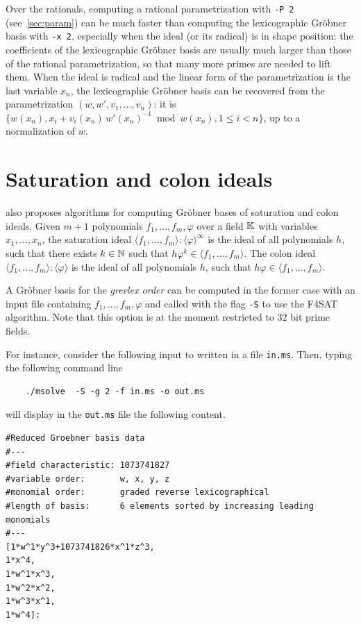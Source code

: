 \documentclass[a4paper,english,11pt]{scrartcl}
\theoremstyle{definition}
\theoremstyle{remark}
\def\leq{\leqslant}
\begin{document}
Over the rationals, computing a rational parametrization with \verb+-P 2+
(see~\cref{sec:param}) can be much faster than computing the lexicographic
Gr\"obner basis with \verb+-x 2+, especially when the ideal (or its radical)
is in shape position: the coefficients of the lexicographic Gr\"obner basis
are usually much larger than those of the rational parametrization, so that
many more primes are needed to lift them. When the
ideal is radical and the linear form of the parametrization is the last
variable $x_n$, the lexicographic Gr\"obner basis can be recovered from the
parametrization $(w, w', v_1, \ldots, v_n)$: it is
$\{w(x_n), x_i + v_i(x_n)\, w'(x_n)^{-1} \bmod w(x_n), 1 \leq i < n\}$, up to
a normalization of $w$.


\section{Saturation and colon ideals}\label{sec:f4sat}
\msolve also proposes algorithms for computing Gr\"obner bases of
saturation and colon ideals. Given $m+1$ polynomials
$f_1,\ldots,f_m,\varphi$ over a field $\mathbb{K}$ with variables
$x_1,\ldots,x_n$,
the saturation ideal
$\langle f_1,\ldots,f_m\rangle:\langle \varphi\rangle^{\infty}$ is the ideal of all
polynomials $h$, such that there exists $k\in\mathbb{N}$ such that
$h \varphi^k\in\langle f_1,\ldots,f_m\rangle$.
The colon ideal
$\langle f_1,\ldots,f_m\rangle:\langle \varphi\rangle$ is the ideal of all
polynomials $h$, such that
$h \varphi\in\langle f_1,\ldots,f_m\rangle$.

A Gr\"obner basis for the \emph{grevlex order} can be computed in the
former case with an input file containing $f_1,\ldots,f_m,\varphi$ and
called with the flag \verb+-S+ to use the F4SAT algorithm. Note that this option
is at the moment restricted to 32 bit prime fields.

For instance, consider the following input to \msolve written in a file
\verb+in.ms+.
Then, typing the following command line
\begin{tcolorbox} %
  \begin{verbatim}
    ./msolve  -S -g 2 -f in.ms -o out.ms
  \end{verbatim}
\end{tcolorbox}
will display in the \verb+out.ms+ file the following content.
\begin{tcolorbox}
  \begin{lstlisting}
#Reduced Groebner basis data
#---
#field characteristic: 1073741827
#variable order:       w, x, y, z
#monomial order:       graded reverse lexicographical
#length of basis:      6 elements sorted by increasing leading monomials
#---
[1*w^1*y^3+1073741826*x^1*z^3,
1*x^4,
1*w^1*x^3,
1*w^2*x^2,
1*w^3*x^1,
1*w^4]:
  \end{lstlisting}
\end{tcolorbox}
\end{document}
